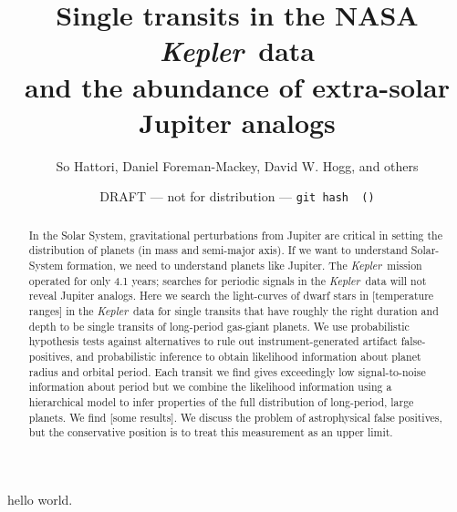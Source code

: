 \documentclass[12pt, preprint]{aastex}
\newcounter{affil}
\newcommand{\project}[1]{\textsl{#1}}
\newcommand{\Kepler}{\project{Kepler}}
\begin{document}
\title{%
  Single transits in the NASA \Kepler\ data\\
  and the abundance of extra-solar Jupiter analogs}

\author{%
  So Hattori\altaffilmark{\ref{nyuad}},
  Daniel Foreman-Mackey\altaffilmark{\ref{ccpp}},
  David W. Hogg\altaffilmark{\ref{ccpp}, \ref{cds}, \ref{mpia}},
  and others}
\label{nyuad}
\label{ccpp}
\label{cds}
\label{mpia}

\date{~\hfill
  DRAFT --- not for distribution --- \texttt{git hash \githash\ (\gitdate)}
  \hfill~}

\begin{abstract}
In the Solar System, gravitational perturbations from Jupiter are
critical in setting the distribution of planets (in mass and
semi-major axis).
If we want to understand Solar-System formation, we need to understand
planets like Jupiter.
The \Kepler\ mission operated for only 4.1 years; searches for
periodic signals in the \Kepler\ data will not reveal Jupiter analogs.
Here we search the light-curves of dwarf stars in [temperature ranges]
in the \Kepler\ data for single transits that have roughly the right
duration and depth to be single transits of long-period gas-giant
planets.
We use probabilistic hypothesis tests against alternatives to rule out
instrument-generated artifact false-positives, and probabilistic
inference to obtain likelihood information about planet radius and
orbital period.
Each transit we find gives exceedingly low signal-to-noise information
about period but we combine the likelihood information using a
hierarchical model to infer properties of the full distribution of
long-period, large planets.
We find [some results].
We discuss the problem of astrophysical false positives, but the
conservative position is to treat this measurement as an upper limit.
\end{abstract}

hello world.
\end{document}
